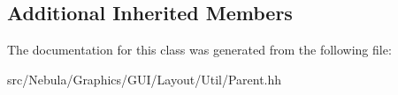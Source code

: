 \subsection*{Additional Inherited Members}


The documentation for this class was generated from the following file\-:\begin{DoxyCompactItemize}
\item 
src/\-Nebula/\-Graphics/\-G\-U\-I/\-Layout/\-Util/Parent.\-hh\end{DoxyCompactItemize}
